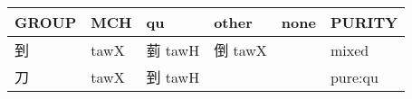 \documentclass[14pt,a4paper]{scrartcl}
\begin{document}
\begin{longtable}[c]{@{}llllll@{}}
\toprule
\begin{minipage}[b]{0.14\columnwidth}\raggedright\strut
GROUP
\strut\end{minipage} &
\begin{minipage}[b]{0.14\columnwidth}\raggedright\strut
MCH
\strut\end{minipage} &
\begin{minipage}[b]{0.14\columnwidth}\raggedright\strut
qu
\strut\end{minipage} &
\begin{minipage}[b]{0.14\columnwidth}\raggedright\strut
other
\strut\end{minipage} &
\begin{minipage}[b]{0.14\columnwidth}\raggedright\strut
none
\strut\end{minipage} &
\begin{minipage}[b]{0.14\columnwidth}\raggedright\strut
PURITY
\strut\end{minipage}\tabularnewline
\midrule
\endhead
\begin{minipage}[t]{0.14\columnwidth}\raggedright\strut
到
\strut\end{minipage} &
\begin{minipage}[t]{0.14\columnwidth}\raggedright\strut
tawX
\strut\end{minipage} &
\begin{minipage}[t]{0.14\columnwidth}\raggedright\strut
菿 tawH
\strut\end{minipage} &
\begin{minipage}[t]{0.14\columnwidth}\raggedright\strut
倒 tawX
\strut\end{minipage} &
\begin{minipage}[t]{0.14\columnwidth}\raggedright\strut
\strut\end{minipage} &
\begin{minipage}[t]{0.14\columnwidth}\raggedright\strut
mixed
\strut\end{minipage}\tabularnewline
\begin{minipage}[t]{0.14\columnwidth}\raggedright\strut
刀
\strut\end{minipage} &
\begin{minipage}[t]{0.14\columnwidth}\raggedright\strut
tawX
\strut\end{minipage} &
\begin{minipage}[t]{0.14\columnwidth}\raggedright\strut
到 tawH
\strut\end{minipage} &
\begin{minipage}[t]{0.14\columnwidth}\raggedright\strut
\strut\end{minipage} &
\begin{minipage}[t]{0.14\columnwidth}\raggedright\strut
\strut\end{minipage} &
\begin{minipage}[t]{0.14\columnwidth}\raggedright\strut
pure:qu
\strut\end{minipage}\tabularnewline
\bottomrule
\end{longtable}
\end{document}
